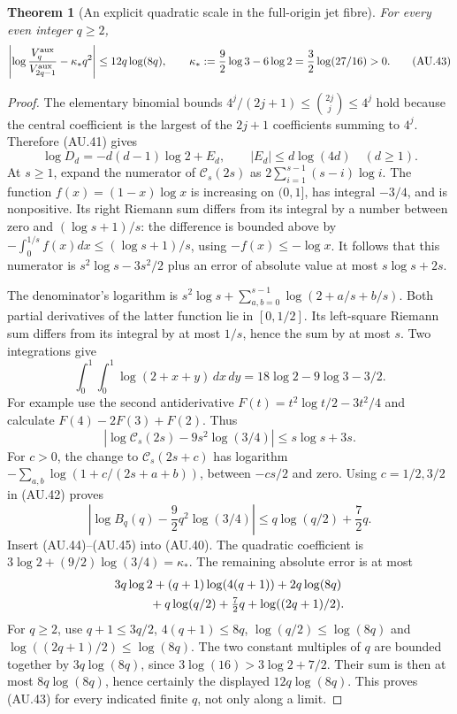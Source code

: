 \documentclass[11pt]{article}
\newtheorem{theorem}{Theorem}[section]
\begin{document}
\begin{theorem}[An explicit quadratic scale in the full-origin jet fibre]
For every even integer $q\ge2$,
\[
 \left|\log\frac{V_q^{\rm aux}}{V_{2q-1}^{\rm aux}}
       -\kappa_*q^2\right|\le12q\log(8q),\qquad
 \kappa_*:=\frac92\log3-6\log2
           =\frac32\log(27/16)>0.                        \tag{AU.43}
\]
\end{theorem}
\begin{proof}
The elementary binomial bounds
$4^j/(2j+1)\le\binom{2j}{j}\le4^j$ hold because the central
coefficient is the largest of the $2j+1$ coefficients summing to
$4^j$. Therefore (AU.41) gives
\[
 \log D_d=-d(d-1)\log2+E_d,\qquad |E_d|\le d\log(4d)
 \quad(d\ge1).                                           \tag{AU.44}
\]
At $s\ge1$, expand the numerator of $\mathcal C_s(2s)$ as
$2\sum_{i=1}^{s-1}(s-i)\log i$. The function
$f(x)=(1-x)\log x$ is increasing on $(0,1]$, has integral $-3/4$,
and is nonpositive. Its right Riemann sum differs from its integral by
a number between zero and $(\log s+1)/s$: the difference is bounded
above by $-\int_0^{1/s}f(x)dx\le(\log s+1)/s$, using
$-f(x)\le-\log x$. It follows that this numerator is
$s^2\log s-3s^2/2$ plus an error of absolute value at most
$s\log s+2s$.

The denominator's logarithm is
$s^2\log s+\sum_{a,b=0}^{s-1}\log(2+a/s+b/s)$.
Both partial derivatives of the latter function lie in $[0,1/2]$.
Its left-square Riemann sum differs from its integral by at most
$1/s$, hence the sum by at most $s$. Two integrations give
\[
 \int_0^1\!\int_0^1\log(2+x+y)\,dx\,dy
       =18\log2-9\log3-3/2.
\]
For example use the second antiderivative
$F(t)=t^2\log t/2-3t^2/4$ and calculate $F(4)-2F(3)+F(2)$.
Thus
\[
 \left|\log\mathcal C_s(2s)-9s^2\log(3/4)\right|
          \le s\log s+3s.
\]
For $c>0$, the change to $\mathcal C_s(2s+c)$ has logarithm
$-\sum_{a,b}\log(1+c/(2s+a+b))$, between $-cs/2$ and zero.
Using $c=1/2,3/2$ in (AU.42) proves
\[
 \left|\log B_q(q)-\frac92q^2\log(3/4)\right|
          \le q\log(q/2)+\frac72q.                       \tag{AU.45}
\]
Insert (AU.44)--(AU.45) into (AU.40). The quadratic coefficient is
$3\log2+(9/2)\log(3/4)=\kappa_*$. The remaining absolute error
is at most
\[
 \begin{split}
 &3q\log2+(q+1)\log(4(q+1))+2q\log(8q)\\
 &\hspace{10mm}+q\log(q/2)+\tfrac72q+\log((2q+1)/2).
 \end{split}
\]
For $q\ge2$, use $q+1\le3q/2$, $4(q+1)\le8q$,
$\log(q/2)\le\log(8q)$ and $\log((2q+1)/2)\le\log(8q)$.
The two constant multiples of $q$ are bounded together by
$3q\log(8q)$, since $3\log(16)>3\log2+7/2$.
Their sum is then at most $8q\log(8q)$, hence certainly the
displayed $12q\log(8q)$. This proves (AU.43) for every indicated
finite $q$, not only along a limit.
\end{proof}
\end{document}
